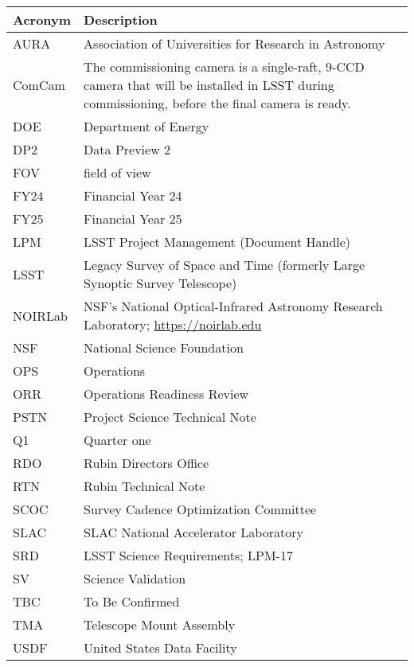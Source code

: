 \addtocounter{table}{-1}
\begin{longtable}{p{}p{}}\hline
\textbf{Acronym} & \textbf{Description}  \\\hline

AURA & Association of Universities for Research in Astronomy \\\hline
ComCam & The commissioning camera is a single-raft, 9-CCD camera that will be installed in LSST during commissioning, before the final camera is ready. \\\hline
DOE & Department of Energy \\\hline
DP2 & Data Preview 2 \\\hline
FOV & field of view \\\hline
FY24 & Financial Year 24 \\\hline
FY25 & Financial Year 25 \\\hline
LPM & LSST Project Management (Document Handle) \\\hline
LSST & Legacy Survey of Space and Time (formerly Large Synoptic Survey Telescope) \\\hline
NOIRLab & NSF's National Optical-Infrared Astronomy Research Laboratory; \url{https://noirlab.edu} \\\hline
NSF & National Science Foundation \\\hline
OPS & Operations \\\hline
ORR & Operations Readiness Review \\\hline
PSTN & Project Science Technical Note \\\hline
Q1 & Quarter one \\\hline
RDO & Rubin Directors Office \\\hline
RTN & Rubin Technical Note \\\hline
SCOC & Survey Cadence Optimization Committee \\\hline
SLAC & SLAC National Accelerator Laboratory \\\hline
SRD & LSST Science Requirements; LPM-17 \\\hline
SV & Science Validation \\\hline
TBC & To Be Confirmed \\\hline
TMA & Telescope Mount Assembly \\\hline
USDF & United States Data Facility \\\hline
\end{longtable}
